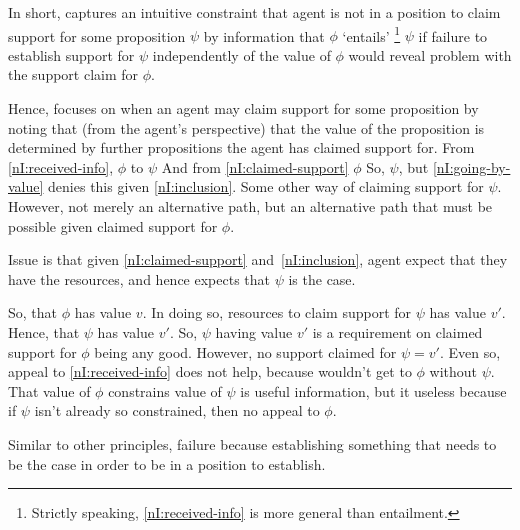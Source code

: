 \begin{note}[Intuition]
  In short, \nI{} captures an intuitive constraint that agent is not in a position to claim support for some proposition \(\psi\) by information that \(\phi\) `entails'\nolinebreak
  \footnote{Strictly speaking, \ref{nI:received-info} is more general than entailment.}
  \(\psi\) if failure to establish support for \(\psi\) independently of the value of \(\phi\) would reveal problem with the support claim for \(\phi\).

  Hence, \nI{} focuses on when an agent may claim support for some proposition by noting that (from the agent's perspective) that the value of the proposition is determined by further propositions the agent has claimed support for.
  From \ref{nI:received-info}, \(\phi\) to \(\psi\)
  And from \ref{nI:claimed-support} \(\phi\)
  So, \(\psi\), but \ref{nI:going-by-value} denies this given \ref{nI:inclusion}.
  Some other way of claiming support for \(\psi\).
  However, not merely an alternative path, but an alternative path that must be possible given claimed support for \(\phi\).

  Issue is that given \ref{nI:claimed-support} and~\ref{nI:inclusion}, agent expect that they have the resources, and hence expects that \(\psi\) is the case.

  So, that \(\phi\) has value \(v\).
  In doing so, resources to claim support for \(\psi\) has value \(v'\).
  Hence, that \(\psi\) has value \(v'\).
  So, \(\psi\) having value \(v'\) is a requirement on claimed support for \(\phi\) being any good.
  However, no support claimed for \(\psi = v'\).
  Even so, appeal to \ref{nI:received-info} does not help, because wouldn't get to \(\phi\) without \(\psi\).
  That value of \(\phi\) constrains value of \(\psi\) is useful information, but it useless because if \(\psi\) isn't already so constrained, then no appeal to \(\phi\).

  Similar to other principles, failure because establishing something that needs to be the case in order to be in a position to establish.
\end{note}

